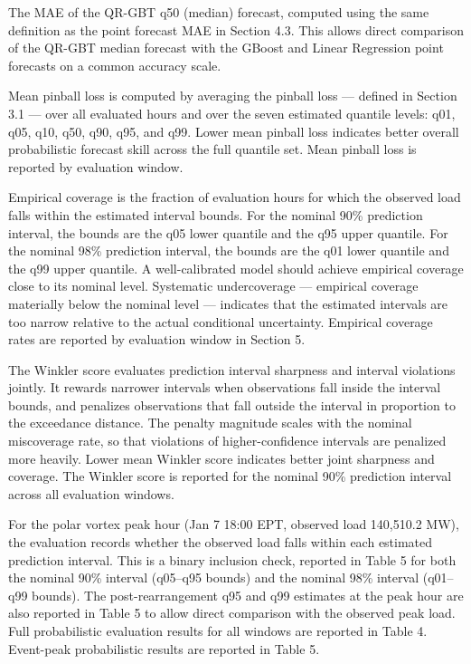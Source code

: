 \documentclass[12pt,a4paper]{article}
\begin{document}
\begin{description}[leftmargin=!, labelwidth=3.5cm, itemsep=4pt]
\item[q50 MAE] The MAE of the QR-GBT q50 (median) forecast, computed using the same definition as the point forecast MAE in Section 4.3. This allows direct comparison of the QR-GBT median forecast with the GBoost and Linear Regression point forecasts on a common accuracy scale.
\item[Mean pinball loss] Mean pinball loss is computed by averaging the pinball loss --- defined in Section 3.1 --- over all evaluated hours and over the seven estimated quantile levels: q01, q05, q10, q50, q90, q95, and q99. Lower mean pinball loss indicates better overall probabilistic forecast skill across the full quantile set. Mean pinball loss is reported by evaluation window.
\item[Empirical coverage] Empirical coverage is the fraction of evaluation hours for which the observed load falls within the estimated interval bounds. For the nominal 90\% prediction interval, the bounds are the q05 lower quantile and the q95 upper quantile. For the nominal 98\% prediction interval, the bounds are the q01 lower quantile and the q99 upper quantile. A well-calibrated model should achieve empirical coverage close to its nominal level. Systematic undercoverage --- empirical coverage materially below the nominal level --- indicates that the estimated intervals are too narrow relative to the actual conditional uncertainty. Empirical coverage rates are reported by evaluation window in Section 5.
\item[Winkler score] The Winkler score evaluates prediction interval sharpness and interval violations jointly. It rewards narrower intervals when observations fall inside the interval bounds, and penalizes observations that fall outside the interval in proportion to the exceedance distance. The penalty magnitude scales with the nominal miscoverage rate, so that violations of higher-confidence intervals are penalized more heavily. Lower mean Winkler score indicates better joint sharpness and coverage. The Winkler score is reported for the nominal 90\% prediction interval across all evaluation windows.
\item[Event-peak interval check] For the polar vortex peak hour (Jan 7 18:00 EPT, observed load 140,510.2 MW), the evaluation records whether the observed load falls within each estimated prediction interval. This is a binary inclusion check, reported in Table 5 for both the nominal 90\% interval (q05–q95 bounds) and the nominal 98\% interval (q01–q99 bounds). The post-rearrangement q95 and q99 estimates at the peak hour are also reported in Table 5 to allow direct comparison with the observed peak load.
Full probabilistic evaluation results for all windows are reported in Table 4. Event-peak probabilistic results are reported in Table 5.
\end{description}
\end{document}
